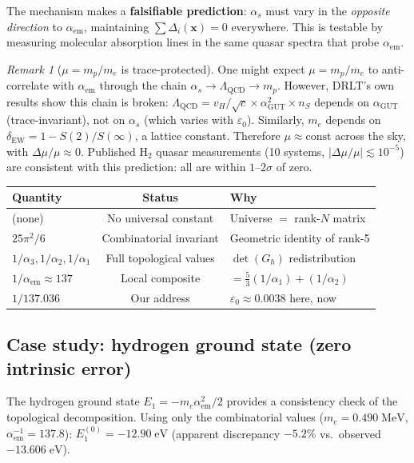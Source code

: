 \documentclass[12pt]{article}
\theoremstyle{remark}
\newtheorem{remark}[theorem]{Remark}
\theoremstyle{definition}
\begin{document}
The mechanism makes a \textbf{falsifiable prediction}: $\alpha_s$ must vary in the \emph{opposite direction} to $\alpha_\text{em}$, maintaining $\sum\Delta_i(\mathbf{x}) = 0$ everywhere. This is testable by measuring molecular absorption lines in the same quasar spectra that probe $\alpha_\text{em}$.

\begin{remark}[$\mu = m_p/m_e$ is trace-protected]
One might expect $\mu = m_p/m_e$ to anti-correlate with $\alpha_\text{em}$ through the chain $\alpha_s \to \Lambda_\text{QCD} \to m_p$. However, DRLT's own results show this chain is broken: $\Lambda_\text{QCD} = v_H/\sqrt{c} \times \alpha_\text{GUT}^2 \times n_S$ depends on $\alpha_\text{GUT}$ (trace-invariant), not on $\alpha_s$ (which varies with $\varepsilon_0$). Similarly, $m_e$ depends on $\delta_\text{EW} = 1 - S(2)/S(\infty)$, a lattice constant. Therefore $\mu \approx \text{const}$ across the sky, with $\Delta\mu/\mu \approx 0$. Published H$_2$ quasar measurements (10 systems, $|\Delta\mu/\mu| \lesssim 10^{-5}$) are consistent with this prediction: all are within $1$--$2\sigma$ of zero.
\end{remark}

\begin{center}
\begin{tabular}{lcl}
\hline
Quantity & Status & Why \\
\hline
(none) & No universal constant & Universe $=$ rank-$N$ matrix \\
$25\pi^2/6$ & Combinatorial invariant & Geometric identity of rank-5 \\
$1/\alpha_3, 1/\alpha_2, 1/\alpha_1$ & Full topological values & $\det(G_h)$ redistribution \\
$1/\alpha_\text{em} \approx 137$ & Local composite & $= \tfrac{5}{3}(1/\alpha_1) + (1/\alpha_2)$ \\
$1/137.036$ & Our address & $\varepsilon_0 \approx 0.0038$ here, now \\
\hline
\end{tabular}
\end{center}

\subsection{Case study: hydrogen ground state (zero intrinsic error)}

The hydrogen ground state $E_1 = -m_e\alpha_\text{em}^2/2$ provides a consistency check of the topological decomposition. Using only the combinatorial values ($m_e = 0.490\;\text{MeV}$, $\alpha_\text{em}^{-1} = 137.8$): $E_1^{(0)} = -12.90\;\text{eV}$ (apparent discrepancy $-5.2\%$ vs.\ observed $-13.606\;\text{eV}$).
\end{document}
